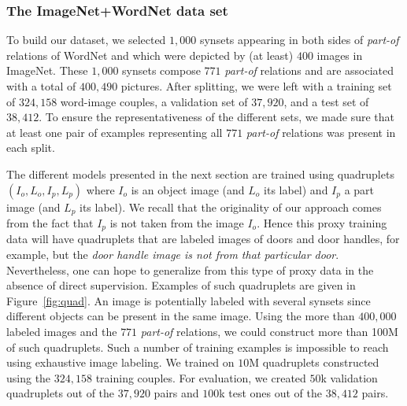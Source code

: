 \subsubsection{The ImageNet+WordNet data set}






To build our dataset, we selected $1,000$ synsets appearing in both
sides of \textit{part-of} relations of WordNet and which were depicted
by (at least) $400$ images in ImageNet.  These $1,000$ synsets compose
$771$ \textit{part-of} relations and are associated with a total of
$400,490$ pictures.
%
After splitting, we were left with a training set of $324,158$
word-image couples, a validation set of $37,920$, and a test set of
$38,412$.
% 
To ensure the representativeness of the different sets, we made sure
that at least one pair of examples representing all $771$
\textit{part-of} relations was present in each split. 

The different models presented in the next section are trained using
quadruplets $(I_o,L_o,I_p,L_p)$ where $I_o$ is an object image (and
$L_o$ its label) and $I_p$ a part image (and $L_p$ its label). We
recall that the originality of our approach comes from the fact that
$I_p$ is not taken from the image $I_o$. 
%
Hence this proxy training data will have quadruplets that are labeled images of doors and door handles, 
for example, but the {\em door handle image is not from that particular door}. Nevertheless, one can hope
to generalize from this type of proxy data in the absence of direct supervision.
%
Examples of such quadruplets are given in Figure~\ref{fig:quad}.
%
An image is
potentially labeled with several synsets since different objects can
be present in the same image. Using the more than $400,000$ labeled
images and the $771$ \textit{part-of} relations, we could construct
more than 100M of such quadruplets. Such a number of training examples
is impossible to reach using exhaustive image labeling.
%
We trained on $10$M quadruplets constructed using the $324,158$
training couples. For evaluation, we created $50$k validation
quadruplets out of the $37,920$ pairs and $100$k test ones out of the
$38,412$ pairs.

